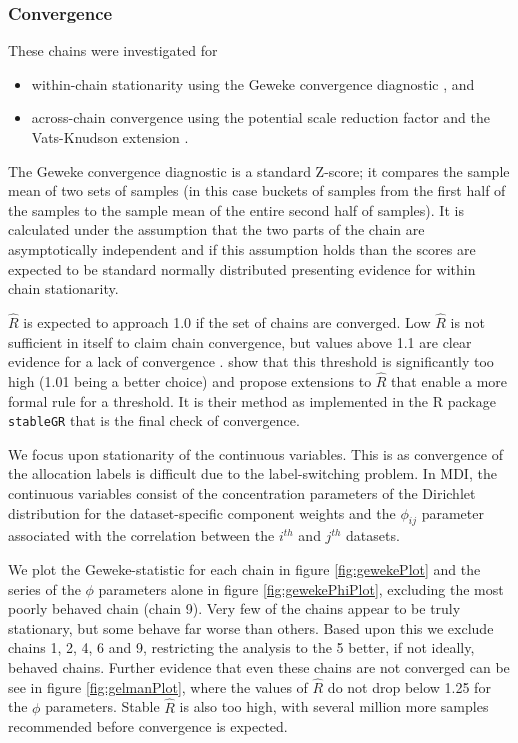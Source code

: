 \documentclass[]{article}
\begin{document}
\subsubsection{Convergence}
These chains were investigated for 
\begin{itemize}
	\item within-chain stationarity using the Geweke convergence diagnostic \citep{geweke1991evaluating}, and
	\item across-chain convergence using the potential scale reduction factor \citep[$\hat{R}$, ][]{gelman1992inference} and the Vats-Knudson extension \citep[\emph{stable $\hat{R}$},][]{vats2018revisiting}.
\end{itemize}
The Geweke convergence diagnostic is a standard Z-score; it compares the sample mean of two sets of samples (in this case buckets of samples from the first half of the samples to the sample mean of the entire second half of samples). It is calculated under the assumption that the two parts of the chain are asymptotically independent and if this assumption holds than the scores are expected to be standard normally distributed presenting evidence for within chain stationarity.

$\hat{R}$ is expected to approach 1.0 if the set of chains are converged. Low $\hat{R}$ is not sufficient in itself to claim chain convergence, but values above 1.1 are clear evidence for a lack of convergence \citep{gelman2013bayesian}. \cite{vats2018revisiting} show that this threshold is significantly too high (1.01 being a better choice) and propose extensions to $\hat{R}$ that enable a more formal rule for a threshold. It is their method as implemented in the R package \texttt{stableGR} \citep{knudson20202stableGR} that is the final check of convergence.

We focus upon stationarity of the continuous variables. This is as convergence of the allocation labels is difficult due to the label-switching problem. In MDI, the continuous variables consist of the concentration parameters of the Dirichlet distribution for the dataset-specific component weights and the $\phi_{ij}$ parameter associated with the correlation between the $i^{th}$ and $j^{th}$ datasets. 

We plot the Geweke-statistic for each chain in figure \ref{fig:gewekePlot} and the series of the $\phi$ parameters alone in figure \ref{fig:gewekePhiPlot}, excluding the most poorly behaved chain (chain 9). Very few of the chains appear to be truly stationary, but some behave far worse than others. Based upon this we exclude chains 1, 2, 4, 6 and 9, restricting the analysis to the 5 better, if not ideally, behaved chains. Further evidence that even these chains are not converged can be see in figure \ref{fig:gelmanPlot}, where the values of $\hat{R}$ do not drop below 1.25 for the $\phi$ parameters. Stable $\hat{R}$ is also too high, with several million more samples recommended before convergence is expected.
\end{document}
